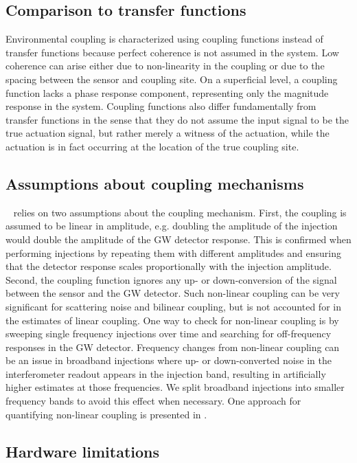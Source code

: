 \subsection{Comparison to transfer functions}

Environmental coupling is characterized using coupling functions instead of transfer functions because perfect coherence is not assumed in the system.
Low coherence can arise either due to non-linearity in the coupling or due to the spacing between the sensor and coupling site.
On a superficial level, a coupling function lacks a phase response component, representing only the magnitude response in the system.
Coupling functions also differ fundamentally from transfer functions in the sense that they do not assume the input signal to be the true actuation signal, but rather merely a witness of the actuation, while the actuation is in fact occurring at the location of the true coupling site.


\subsection{Assumptions about coupling mechanisms}

~ relies on two assumptions about the coupling mechanism.
First, the coupling is assumed to be linear in amplitude, e.g. doubling the amplitude of the injection would double the amplitude of the \ac{GW} detector response.
This is confirmed when performing injections by repeating them with different amplitudes and ensuring that the detector response scales proportionally with the injection amplitude.
Second, the coupling function ignores any up- or down-conversion of the signal between the sensor and the \ac{GW} detector.
Such non-linear coupling can be very significant for scattering noise and bilinear coupling, but is not accounted for in the estimates of linear coupling.
One way to check for non-linear coupling is by sweeping single frequency injections over time and searching for off-frequency responses in the \ac{GW} detector.
Frequency changes from non-linear coupling can be an issue in broadband injections where up- or down-converted noise in the interferometer readout appears in the injection band, resulting in artificially higher estimates at those frequencies.
We split broadband injections into smaller frequency bands to avoid this effect when necessary.
One approach for quantifying non-linear coupling is presented in \citet{Washimi_2020}.


\subsection{Hardware limitations}\label{sec:uncertainties-hardware}

